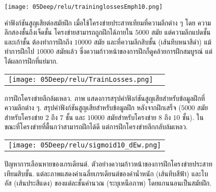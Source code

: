 %
\begin{figure}
	\begin{center}
		\texttt{[image: 05Deep/relu/traininglossesEmph10.png]}	
		\caption[ค่าฟังก์ชันสูญเสียต่อสมัยฝึกที่ความลึกต่าง ๆ]{
			ค่าฟังก์ชันสูญเสียต่อสมัยฝึก เมื่อใช้โครงข่ายประสาทเทียมที่ความลึกต่าง ๆ
			โดย ความลึกสองชั้นถึงเจ็ดชั้น โครงข่ายสามารถถูกฝึกได้ภายใน $5000$ สมัย
			แต่ความลึกแปดชั้นและเก้าชั้น ต้องทำการฝึกถึง $10000$ สมัย
			และที่ความลึกสิบชั้น (เส้นทึบหนาสีดำ) แม้ทำการฝึกไป $10000$ สมัยแล้ว ซึ่งความก้าวหน้าของการฝึกก็ดูคล้ายการฝึกสมบูรณ์ 
			แต่ได้ผลการฝึกที่แย่มาก.}
		\label{fig: deep vanishing gradient training losses}
	\end{center}
\end{figure}
%

%
\begin{figure}
	\begin{center}
		\begin{tabular}{cc}
			\texttt{[image: 05Deep/relu/TrainLosses.png]}
		\end{tabular}		
		\caption[การฝึกโครงข่ายลึกล้มเหลว]{การฝึกโครงข่ายลึกล้มเหลว.
			ภาพ แสดงการสรุปค่าฟังก์ชันสูญเสียสำหรับข้อมูลฝึกที่ความลึกต่าง ๆ.
			สรุปค่าฟังก์ชันสูญเสียสำหรับข้อมูลฝึก หลังจากฝึกเสร็จ ($5000$ สมัยสำหรับโครงข่าย $2$ ถึง $7$ ชั้น และ $10000$ สมัยสำหรับโครงข่าย $8$ ถึง $10$ ชั้น).
			ในขณะที่โครงข่ายที่ตื้นกว่าสามารถฝึกได้ดี แต่การฝึกโครงข่ายลึกกลับล้มเหลว.
		}
		\label{fig: deep vanishing gradient final training losses}
	\end{center}
\end{figure}
	
%
\begin{figure}
	\begin{center}
		\begin{tabular}{c}
			\texttt{[image: 05Deep/relu/sigmoid10\_dEw.png]}	
		\end{tabular}		
		\caption[ปัญหาการเลือนหายของเกรเดียนต์]{ปัญหาการเลือนหายของเกรเดียนต์.
			ตัวอย่างความก้าวหน้าของการฝึกโครงข่ายประสาทเทียมสิบชั้น.
			แต่ละภาพแสดงค่าเฉลี่ยเกรเดียนต์ของค่าน้ำหนัก (เส้นทึบสีฟ้า) และไบอัส (เส้นประสีแดง) ของแต่ละชั้นคำนวณ (ระบุเหนือภาพ)
			โดยแกนนอนเป็นสมัยฝึก.
		}
		\label{fig: deep vanishing gradient sigmoid}
	\end{center}
\end{figure}
%

